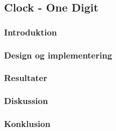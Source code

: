 {
    \newcommand{\labelprefix}{src6-2}

    \subsection{Clock - One Digit}

    \subsubsection{Introduktion}

    \subsubsection{Design og implementering}

    \subsubsection{Resultater}


    \subsubsection{Diskussion}

    \subsubsection{Konklusion}
   
}